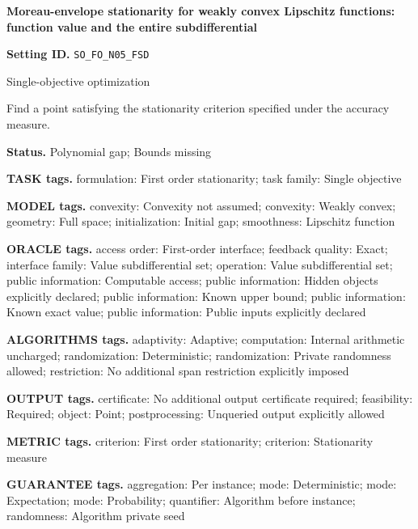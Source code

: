 \documentclass[10pt,a4paper]{article}
\begin{document}
\raggedright

{\LARGE\bfseries\sffamily\color{AtlasNavy} Moreau-envelope stationarity for weakly convex Lipschitz functions: function value and the entire subdifferential\par}\vspace{5pt}


\textbf{Setting ID.} \texttt{SO\_\allowbreak{}FO\_\allowbreak{}N05\_\allowbreak{}FSD}



Single-objective optimization



Find a point satisfying the stationarity criterion specified under the accuracy measure.



\textbf{Status.} Polynomial gap; Bounds missing



\textbf{TASK tags.} formulation: First order stationarity; task family: Single objective



\textbf{MODEL tags.} convexity: Convexity not assumed; convexity: Weakly convex; geometry: Full space; initialization: Initial gap; smoothness: Lipschitz function



\textbf{ORACLE tags.} access order: First-order interface; feedback quality: Exact; interface family: Value subdifferential set; operation: Value subdifferential set; public information: Computable access; public information: Hidden objects explicitly declared; public information: Known upper bound; public information: Known exact value; public information: Public inputs explicitly declared



\textbf{ALGORITHMS tags.} adaptivity: Adaptive; computation: Internal arithmetic uncharged; randomization: Deterministic; randomization: Private randomness allowed; restriction: No additional span restriction explicitly imposed



\textbf{OUTPUT tags.} certificate: No additional output certificate required; feasibility: Required; object: Point; postprocessing: Unqueried output explicitly allowed



\textbf{METRIC tags.} criterion: First order stationarity; criterion: Stationarity measure



\textbf{GUARANTEE tags.} aggregation: Per instance; mode: Deterministic; mode: Expectation; mode: Probability; quantifier: Algorithm before instance; randomness: Algorithm private seed
\end{document}
